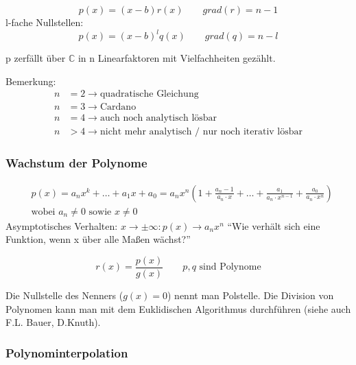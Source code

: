 \[
	p(x)=(x-b)r(x) \qquad grad(r)=n-1
\]
l-fache Nullstellen:
\[
	p(x)=(x-b)^lq(x) \qquad grad(q)=n-l
\]
\begin{theorem}\flush
	p zerfällt über \( \mathbb{C} \) in n Linearfaktoren mit Vielfachheiten gezählt.
\end{theorem}

\noindent Bemerkung:	
\begin{align*}
	n &= 2 \rightarrow \text{quadratische Gleichung} \\
	n &= 3 \rightarrow \text{Cardano} \\
	n &= 4 \rightarrow \text{auch noch analytisch lösbar} \\
	n &> 4 \rightarrow \text{nicht mehr analytisch / nur noch iterativ lösbar}
\end{align*}

\subsubsection{Wachstum der Polynome} %
\label{ssub:wachstum_der_polynome}

\begin{align*}
		&p(x)=a_nx^k+\ldots+a_1x+a_0=a_nx^n(1+\frac{a_n-1}{a_n\cdot x}+\ldots+\frac{a_1}{a_n\cdot x^{n-1}}+\frac{a_0}{a_n\cdot x^n}) \\
		&\text{wobei } a_n\neq0 \text{ sowie } x\neq0 
\end{align*}
Asymptotisches Verhalten: \( x \rightarrow \pm \infty:p(x)\rightarrow a_nx^n \) \newline "`Wie verhält sich eine Funktion, wenn x über alle Maßen wächst?"'

\begin{definition}
	\[
			r(x)=\frac{p(x)}{g(x)} \qquad p,q \text{ sind Polynome}
	\]
\end{definition}
\noindent Die Nullstelle des Nenners (\( g(x)=0 \)) nennt man Polstelle. Die Division von Polynomen kann man mit dem Euklidischen Algorithmus durchführen (siehe auch F.L. Bauer, D.Knuth).


\subsubsection{Polynominterpolation} %
\label{ssub:polynominterpolation}


